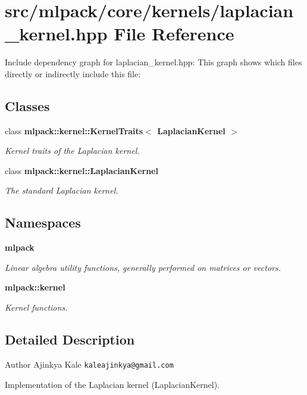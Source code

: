 \section{src/mlpack/core/kernels/laplacian\-\_\-kernel.hpp File Reference}
\label{laplacian__kernel_8hpp}
Include dependency graph for laplacian\-\_\-kernel.\-hpp\-:
This graph shows which files directly or indirectly include this file\-:
\subsection*{Classes}
\begin{DoxyCompactItemize}
\item 
class {\bf mlpack\-::kernel\-::\-Kernel\-Traits$<$ Laplacian\-Kernel $>$}
\begin{DoxyCompactList}\small\item\em Kernel traits of the Laplacian kernel. \end{DoxyCompactList}\item 
class {\bf mlpack\-::kernel\-::\-Laplacian\-Kernel}
\begin{DoxyCompactList}\small\item\em The standard Laplacian kernel. \end{DoxyCompactList}\end{DoxyCompactItemize}
\subsection*{Namespaces}
\begin{DoxyCompactItemize}
\item 
{\bf mlpack}
\begin{DoxyCompactList}\small\item\em Linear algebra utility functions, generally performed on matrices or vectors. \end{DoxyCompactList}\item 
{\bf mlpack\-::kernel}
\begin{DoxyCompactList}\small\item\em Kernel functions. \end{DoxyCompactList}\end{DoxyCompactItemize}


\subsection{Detailed Description}
\begin{DoxyAuthor}{Author}
Ajinkya Kale {\tt kaleajinkya@gmail.\-com}
\end{DoxyAuthor}
Implementation of the Laplacian kernel (Laplacian\-Kernel).

